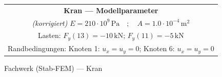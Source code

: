 \documentclass[a4paper,11pt]{article}
\begin{document}
\begin{figure}[h]
\vspace{0.6em}
\begin{tabular}{c}
\textbf{Kran — Modellparameter}\\
\textit{(korrigiert)} $E=210\cdot10^{9}\,\mathrm{Pa}\quad;\quad A=1.0\cdot10^{-4}\,\mathrm{m^2}$\\
Lasten: $F_{y}(13)=-10\,\mathrm{kN}$;\; $F_{y}(11)=-5\,\mathrm{kN}$\\
Randbedingungen: Knoten 1: $u_x=u_y=0$;\; Knoten 6: $u_x=u_y=0$
\end{tabular}
\caption{Fachwerk (Stab-FEM) — Kran}
\end{figure}
\end{document}
